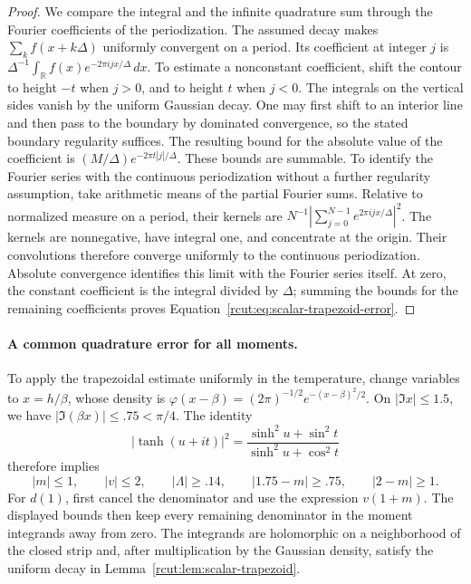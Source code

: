 \begin{proof}
We compare the integral and the infinite quadrature sum through the
Fourier coefficients of the periodization. The assumed decay makes
\(\sum_k f(x+k\Delta)\) uniformly convergent on a period. Its
coefficient at integer \(j\) is
\(\Delta^{-1}\int_{\mathbb R}f(x)e^{-2\pi ijx/\Delta}\,dx\).
To estimate a nonconstant coefficient, shift the contour to height
\(-t\) when \(j>0\), and to height \(t\) when \(j<0\). The integrals
on the vertical sides vanish by the uniform Gaussian decay. One may
first shift to an interior line and then pass to the boundary by
dominated convergence, so the stated boundary regularity suffices.
The resulting bound for the absolute value of the coefficient is
\((M/\Delta)e^{-2\pi t|j|/\Delta}\).
These bounds are summable. To identify the Fourier series with the
continuous periodization without a further regularity assumption, take
arithmetic means of the partial Fourier sums. Relative to normalized
measure on a period, their kernels are
\(N^{-1}|\sum_{j=0}^{N-1}e^{2\pi ijx/\Delta}|^2\).
The kernels are nonnegative, have integral one, and concentrate at the
origin. Their convolutions therefore converge uniformly to the
continuous periodization. Absolute convergence identifies this limit
with the Fourier series itself. At zero, the constant coefficient is
the integral divided by \(\Delta\); summing the bounds for the remaining
coefficients proves Equation~\eqref{rcut:eq:scalar-trapezoid-error}.
\end{proof}

\paragraph{A common quadrature error for all moments.}
To apply the trapezoidal estimate uniformly in the temperature, change
variables to \(x=h/\beta\), whose density is
\(\varphi(x-\beta)=(2\pi)^{-1/2}e^{-(x-\beta)^2/2}\).
On \(|\Im x|\leq1.5\), we have \(|\Im(\beta x)|\leq.75<\pi/4\).
The identity
\[
 |\tanh(u+it)|^2
  =\frac{\sinh^2u+\sin^2t}{\sinh^2u+\cos^2t}
\]
therefore implies
\begin{equation}
 |m|\leq1,\qquad |v|\leq2,\qquad |\Lambda{}|\geq.14,
 \qquad |1.75-m|\geq.75,\qquad |2-m|\geq1.
 \label{rcut:eq:scalar-strip-bounds}
\end{equation}
For \(d(1)\), first cancel the denominator and use the expression
\(v(1+m)\). The displayed bounds then keep every remaining denominator
in the moment integrands away from zero. The integrands are holomorphic
on a neighborhood of the closed strip and, after multiplication by the
Gaussian density, satisfy the uniform decay in
Lemma~\ref{rcut:lem:scalar-trapezoid}.

